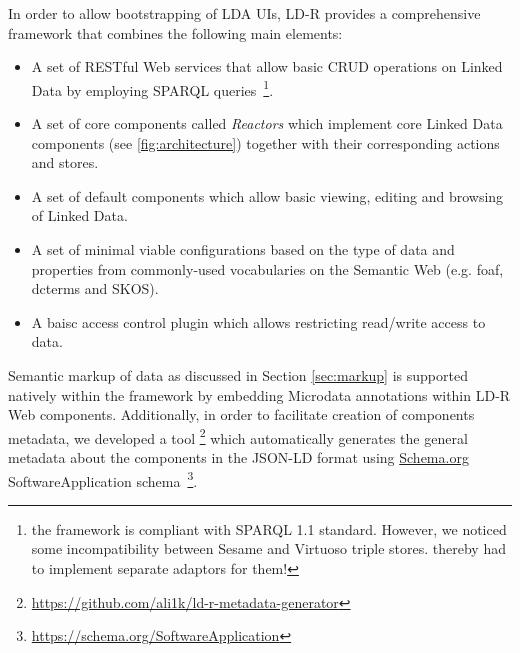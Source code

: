 \documentclass{acm_proc_article-sp}
\begin{document}
In order to allow bootstrapping of LDA UIs, LD-R provides a comprehensive framework that combines the following main elements:
\begin{itemize}

\item A set of RESTful Web services that allow basic CRUD operations on Linked Data by  employing SPARQL queries~\footnote{the framework is compliant with SPARQL 1.1 standard. However, we noticed some incompatibility between Sesame and Virtuoso triple stores. thereby had to implement separate adaptors for them!}.

\item A set of core components called \emph{Reactors} which implement core Linked Data components (see \autoref{fig:architecture}) together with their corresponding actions and stores.

\item A set of default components which allow basic viewing, editing and browsing of Linked Data.

\item A set of minimal viable configurations based on the type of data and properties from commonly-used vocabularies on the Semantic Web (e.g. foaf, dcterms and SKOS).

\item A baisc access control plugin which allows restricting read/write access to data.

\end{itemize}


Semantic markup of data as discussed in Section \ref{sec:markup} is supported natively within the framework by embedding Microdata annotations within LD-R Web components.
Additionally, in order to facilitate creation of components metadata, we developed a tool \footnote{\url{https://github.com/ali1k/ld-r-metadata-generator}} which automatically generates the general metadata about the components in the JSON-LD format using \url{Schema.org} SoftwareApplication schema~\footnote{\url{https://schema.org/SoftwareApplication}}.
\end{document}
